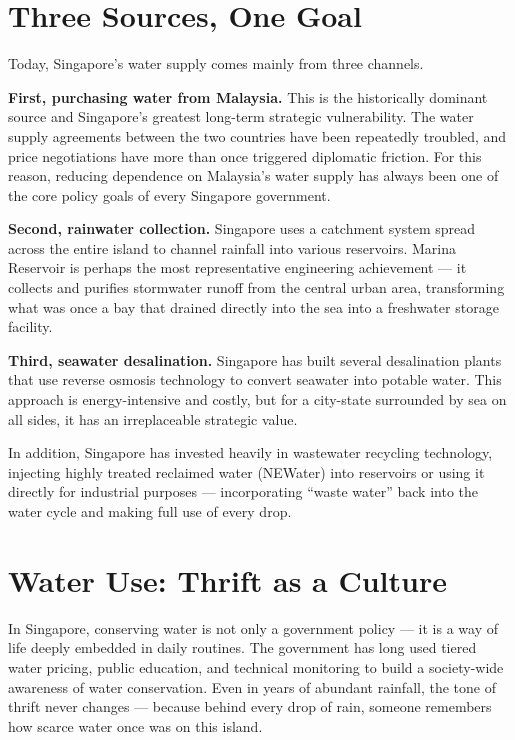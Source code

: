 \section{Three Sources, One Goal}

Today, Singapore's water supply comes mainly from three channels.

\textbf{First, purchasing water from Malaysia.} This is the historically dominant source and Singapore's greatest long-term strategic vulnerability. The water supply agreements between the two countries have been repeatedly troubled, and price negotiations have more than once triggered diplomatic friction. For this reason, reducing dependence on Malaysia's water supply has always been one of the core policy goals of every Singapore government.

\textbf{Second, rainwater collection.} Singapore uses a catchment system spread across the entire island to channel rainfall into various reservoirs. Marina Reservoir is perhaps the most representative engineering achievement --- it collects and purifies stormwater runoff from the central urban area, transforming what was once a bay that drained directly into the sea into a freshwater storage facility.

\textbf{Third, seawater desalination.} Singapore has built several desalination plants that use reverse osmosis technology to convert seawater into potable water. This approach is energy-intensive and costly, but for a city-state surrounded by sea on all sides, it has an irreplaceable strategic value.

In addition, Singapore has invested heavily in wastewater recycling technology, injecting highly treated reclaimed water (NEWater) into reservoirs or using it directly for industrial purposes --- incorporating ``waste water'' back into the water cycle and making full use of every drop.

\section{Water Use: Thrift as a Culture}

In Singapore, conserving water is not only a government policy --- it is a way of life deeply embedded in daily routines. The government has long used tiered water pricing, public education, and technical monitoring to build a society-wide awareness of water conservation. Even in years of abundant rainfall, the tone of thrift never changes --- because behind every drop of rain, someone remembers how scarce water once was on this island.

